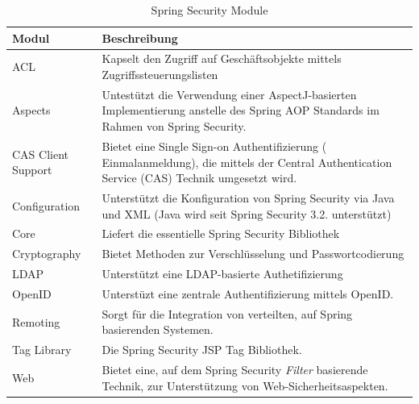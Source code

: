 \begin{table}[hbt]
 \caption[Spring Security Module, Quelle: Walls (2011), S. 246]{Spring Security Module \cite{walls:2011}}
  \begin{tabular}{lp{11cm}}
    \toprule 
    \textbf{Modul} & \textbf{Beschreibung} \\
    \hline
    ACL & Kapselt den Zugriff auf Geschäftsobjekte mittels Zugriffssteuerungslisten \\
    Aspects & Untestützt die Verwendung einer AspectJ-basierten Implementierung anstelle des Spring AOP Standards im Rahmen von Spring Security. \\
	CAS Client Support & Bietet eine Single Sign-on Authentifizierung (\grqq{} Einmalanmeldung\grqq{}), die mittels der Central Authentication Service (CAS) Technik umgesetzt wird. \\
	Configuration & Unterstützt die Konfiguration von Spring Security via Java und XML 
	(Java wird seit Spring Security 3.2. unterstützt) \\
	Core & Liefert die essentielle Spring Security Bibliothek \\
	Cryptography & Bietet Methoden zur Verschlüsselung und Passwortcodierung \\
	LDAP & Unterstützt eine LDAP-basierte Authetifizierung \\
	OpenID & Unterstüzt eine zentrale Authentifizierung mittels OpenID. \\
	Remoting & Sorgt für die Integration von verteilten, auf Spring basierenden Systemen. \\
	Tag Library & Die Spring Security JSP Tag Bibliothek. \\
	Web & Bietet eine, auf dem Spring Security \textit{Filter} basierende Technik, zur Unterstützung von Web-Sicherheitsaspekten. \\
	\bottomrule
  \end{tabular}
\end{table}

